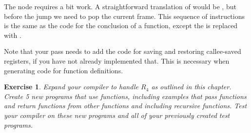 \documentclass[11pt]{book}
\newtheorem{exercise}[theorem]{Exercise}
\begin{document}
The  node requires a bit work. A straightforward
translation of  would be , but
before the jump we need to pop the current frame. This sequence of
instructions is the same as the code for the conclusion of a function,
except the  is replaced with .

Note that your  pass needs to add the code for saving
and restoring callee-saved registers, if you have not already
implemented that. This is necessary when generating code for function
definitions.

\begin{exercise}\normalfont
Expand your compiler to handle $R_4$ as outlined in this chapter.
Create 5 new programs that use functions, including examples that pass
functions and return functions from other functions and including
recursive functions. Test your compiler on these new programs and all
of your previously created test programs.
\end{exercise}
\end{document}
